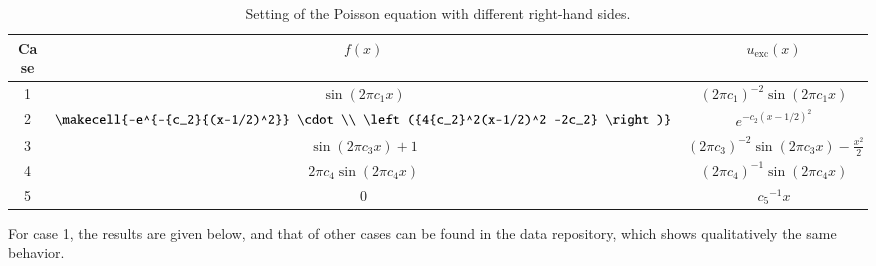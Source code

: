 \documentclass[review,3p]{elsarticle}
\begin{document}

\begin{table}[!ht]
\centering
\caption [w]{Setting of the Poisson equation with different right-hand sides.} 
\label{scaling_cases_Poisson}
 \begin{tabular}{c c c} \hline      
Case & $f(x)$ & $u_{\text{exc}}(x)$ \\ \hline
1 & {$\sin (2 \pi c_1x)$} & ${(2 \pi c_1)}^{-2} \sin (2 \pi c_1x)$\\ \hline
2 & $\makecell{-e^{-{c_2}{(x-1/2)^2}} \cdot \\ \left({4{c_2}^2(x-1/2)^2 -2c_2} \right)}$ & $e^{-{c_2}{{(x-1/2)^2}}}$ \\ \hline
3 & $\sin (2 \pi c_3 x) +1$ & ${(2 \pi c_3)}^{-2}\sin (2 \pi c_3 x)-\frac{x^2}{2}$ \\ \hline
4 & $2 \pi c_4 \sin (2 \pi c_4 x)$ & ${(2 \pi c_4)}^{-1} \sin (2 \pi c_4x)$ \\ \hline
5 & $0$ & ${c_5}^{-1} x$ \\ \hline
\end{tabular}
\end{table}



For case 1, the results are given below, and that of other cases can be found in the data repository, which shows qualitatively the same behavior.
\end{document}
